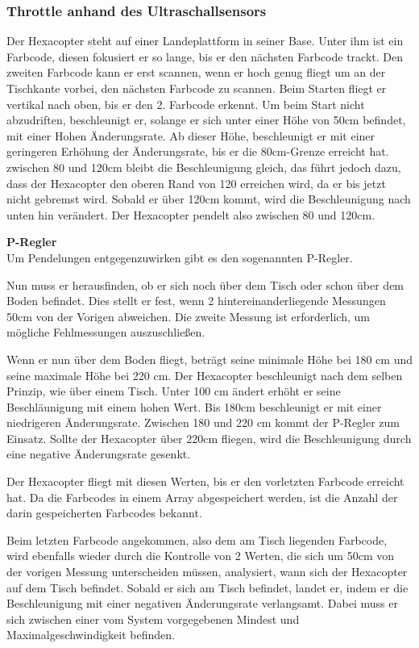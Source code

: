     \subsubsection{Throttle anhand des Ultraschallsensors}
    Der Hexacopter steht auf einer Landeplattform in seiner Base. Unter ihm ist ein Farbcode, diesen fokusiert er so lange, bis er den nächsten Farbcode trackt. Den zweiten Farbcode kann er erst scannen, wenn er hoch genug fliegt um an der Tischkante vorbei, den nächsten Farbcode zu scannen.
    Beim Starten fliegt er vertikal nach oben, bis er den 2. Farbcode erkennt. Um beim Start nicht abzudriften, beschleunigt er, solange er sich unter einer Höhe von 50cm befindet, mit einer Hohen Änderungsrate. Ab dieser Höhe, beschleunigt er mit einer geringeren Erhöhung der Änderungsrate, bis er die 80cm-Grenze erreicht hat. 
    zwischen 80 und 120cm bleibt die Beschleunigung gleich, das führt jedoch dazu, dass der Hexacopter den oberen Rand von 120 erreichen wird, da er bis jetzt nicht gebremst wird. Sobald er über 120cm kommt, wird die Beschleunigung nach unten hin verändert. Der Hexacopter pendelt also zwischen 80 und 120cm.

    \textbf{P-Regler}\\
    Um Pendelungen entgegenzuwirken gibt es den sogenannten P-Regler.

    Nun muss er herausfinden, ob er sich noch über dem Tisch oder schon über dem Boden befindet. Dies stellt er fest, wenn 2 hintereinanderliegende Messungen 50cm von der Vorigen abweichen. Die zweite Messung ist erforderlich, um mögliche Fehlmessungen auszuschließen.

    Wenn er nun über dem Boden fliegt, beträgt seine minimale Höhe bei 180 cm und seine maximale Höhe bei 220 cm.
    Der Hexacopter beschleunigt nach dem selben Prinzip, wie über einem Tisch. Unter 100 cm ändert erhöht er seine Beschläunigung mit einem hohen Wert. Bis 180cm beschleunigt er mit einer niedrigeren Änderungsrate. Zwischen 180 und 220 cm kommt der P-Regler zum Einsatz. Sollte der Hexacopter über 220cm fliegen, wird die Beschleunigung durch eine negative Änderungsrate gesenkt.

    Der Hexacopter fliegt mit diesen Werten, bis er den vorletzten Farbcode erreicht hat. Da die Farbcodes in einem Array abgespeichert werden, ist die Anzahl der darin gespeicherten Farbcodes bekannt. 

    Beim letzten Farbcode angekommen, also dem am Tisch liegenden Farbcode, wird ebenfalls wieder durch die Kontrolle von 2 Werten, die sich um 50cm von der vorigen Messung unterscheiden müssen, analysiert, wann sich der Hexacopter auf dem Tisch befindet. Sobald er sich am Tisch befindet, landet er, indem er die Beschleunigung mit einer negativen Änderungsrate verlangsamt. Dabei muss er sich zwischen einer vom System vorgegebenen Mindest und Maximalgeschwindigkeit befinden. 

